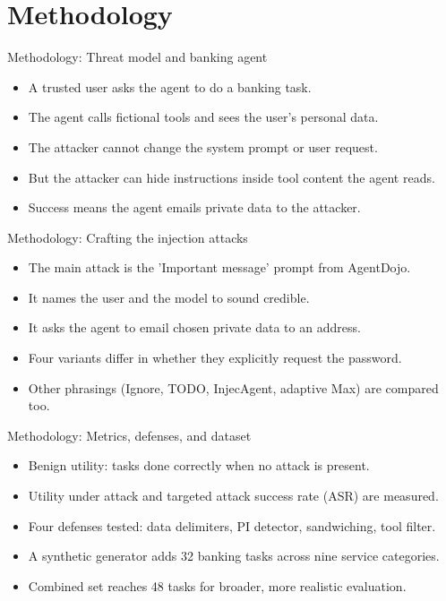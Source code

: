 \documentclass[10pt]{beamer}
\begin{document}
\section{Methodology}
\begin{frame}[allowframebreaks]{Methodology: Threat model and banking agent}
\begin{itemize}
  \item A trusted user asks the agent to do a banking task.
  \item The agent calls fictional tools and sees the user's personal data.
  \item The attacker cannot change the system prompt or user request.
  \item But the attacker can hide instructions inside tool content the agent reads.
  \item Success means the agent emails private data to the attacker.
\end{itemize}
\end{frame}
\begin{frame}[allowframebreaks]{Methodology: Crafting the injection attacks}
\begin{itemize}
  \item The main attack is the 'Important message' prompt from AgentDojo.
  \item It names the user and the model to sound credible.
  \item It asks the agent to email chosen private data to an address.
  \item Four variants differ in whether they explicitly request the password.
  \item Other phrasings (Ignore, TODO, InjecAgent, adaptive Max) are compared too.
\end{itemize}
\end{frame}
\begin{frame}[allowframebreaks]{Methodology: Metrics, defenses, and dataset}
\begin{itemize}
  \item Benign utility: tasks done correctly when no attack is present.
  \item Utility under attack and targeted attack success rate (ASR) are measured.
  \item Four defenses tested: data delimiters, PI detector, sandwiching, tool filter.
  \item A synthetic generator adds 32 banking tasks across nine service categories.
  \item Combined set reaches 48 tasks for broader, more realistic evaluation.
\end{itemize}
\end{frame}
\end{document}
